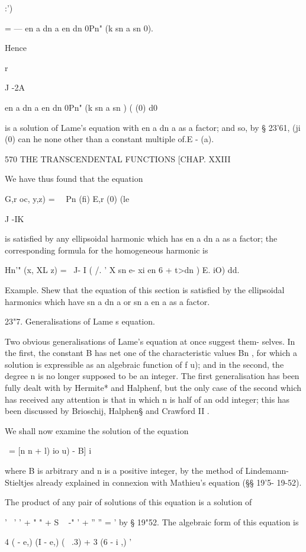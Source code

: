 {{{{{{{{:')

= — en a dn a en dn 0Pn" (k sn a sn 0).

Hence

r

J -2A

en a dn a en dn 0Pn" (k sn a sn ) ( (0) d0

is a solution of Lame's equation with en a dn a as a factor; and so,
by § 23'61, (ji (0) can he none other than a constant multiple of.E -
(a).

570 THE TRANSCENDENTAL FUNCTIONS [CHAP. XXIII

We have thus found that the equation

G,r oc, y,z) = \ \ Pn (fi) E,r (0) (le

J -IK

is satisfied by any ellipsoidal harmonic which has en a dn a as a
factor; the corresponding formula for the homogeneous harmonic is

Hn'" (x, XL z) = \ J- I ( /. ' X sn e- xi en 6 + t>dn ) E. iO) dd.

Example. Shew that the equation of this section is satisfied by the
ellipsoidal harmonics which have sn a dn a or sn a en a as a factor.

23"7. Generalisations of Lame s equation.

Two obvious generalisations of Lame's equation at once suggest them-
selves. In the first, the constant B has net one of the characteristic
values Bn , for which a solution is expressible as an algebraic
function of f u); and in the second, the degree n is no longer
supposed to be an integer. The first generalisation has been fully
dealt with by Hermite* and Halphenf, but the only case of the second
which has received any attention is that in which n is half of an odd
integer; this has been discussed by Brioschij, Halphen§ and Crawford
II .

We shall now examine the solution of the equation

 \ = [n n + l) io u) - B] i\,

where B is arbitrary and n is a positive integer, by the method of
Lindemann- Stieltjes already explained in connexion with Mathieu's
equation (§§ 19'5- 19-52).

The product of any pair of solutions of this equation is a solution of

'~ ' ' + " " + S ~ -" ' + '' '' = ' by § 19"52. The algebraic form of
this equation is

4 ( - e,) (I - e,) ( \ .3) + 3 (6 - i ,) '

}}}}}}}}
